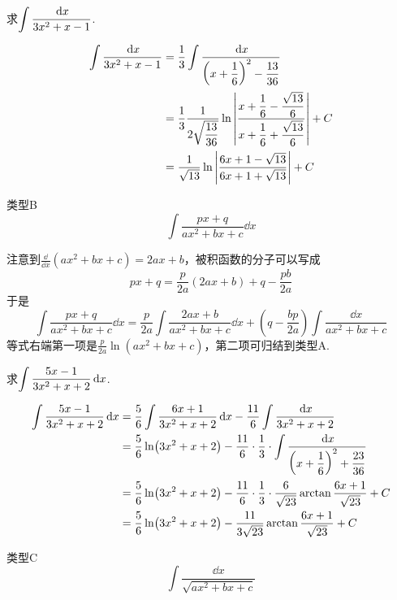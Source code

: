 \begin{example}
    求$\displaystyle\int \dfrac{\,{\rm d} x}{3x^2+x-1}$.
\end{example}

\begin{solution}
\[\begin{split}
    \displaystyle\int \dfrac{\,{\rm d} x}{3x^2+x-1}&=\dfrac{1}{3}\int \dfrac{\,{\rm d} x}{\left(x+\dfrac{1}{6}\right)^2-\dfrac{13}{36}}\\
&=\dfrac{1}{3}\dfrac{1}{2\sqrt{\dfrac{13}{36}}}\ln\left|\dfrac{x+\dfrac{1}{6}-\dfrac{\sqrt{13}}{6}}{x+\dfrac{1}{6}+\dfrac{\sqrt{13}}{6}}\right|+C\\
&=\dfrac{1}{\sqrt{13}}\ln\left|\dfrac{6x+1-\sqrt{13}}{6x+1+\sqrt{13}}\right|+C
\end{split}\]    
\end{solution}

\begin{blk}
    {类型B}
   \[\int \frac{px+q}{ax^2+bx+c}\dd x\]
   \end{blk}

注意到$\frac{\dd}{\dd x}(ax^2+bx+c)=2ax+b$，被积函数的分子可以写成
\[px+q=\frac{p}{2a}(2ax+b)+q-\frac{pb}{2a}\]
于是
\[\int\frac{px+q}{ax^2+bx+c}\dd x=\frac{p}{2a}\int\frac{2ax+b}{ax^2+bx+c}\dd x+\left(q-\frac{bp}{2a}\right)\int\frac{\dd x}{ax^2+bx+c}\]
等式右端第一项是$\frac{p}{2a}\ln(ax^2+bx+c)$，第二项可归结到类型A.

\begin{example}
    求$\displaystyle\int \dfrac{5x-1}{3x^2+x+2}\,{\rm d} x$.
\end{example}

\begin{solution}
\[\begin{split}
    \displaystyle\int \dfrac{5x-1}{3x^2+x+2}\,{\rm d} x&=\dfrac{5}{6}\int \dfrac{6x+1}{3x^2+x+2}\,{\rm d} x-\dfrac{11}{6}\int\dfrac{\,{\rm d} x}{3x^2+x+2}\\
&=\dfrac{5}{6}\ln(3x^2+x+2)-\dfrac{11}{6}\cdot \dfrac{1}{3}\cdot \int \dfrac{\,{\rm d} x}{\left(x+\dfrac{1}{6}\right)^2+\dfrac{23}{36}}\\
&=\dfrac{5}{6}\ln(3x^2+x+2)-\dfrac{11}{6}\cdot\dfrac{1}{3}\cdot\dfrac{6}{\sqrt{23}}\arctan\dfrac{6x+1}{\sqrt{23}}+C\\
&=\dfrac{5}{6}\ln(3x^2+x+2)-\dfrac{11}{3\sqrt{23}}\arctan\dfrac{6x+1}{\sqrt{23}}+C
\end{split}\]    
\end{solution}

\begin{blk}{类型C}
\[\int \frac{\dd x}{\sqrt{ax^2+bx+c}}\]
\end{blk}

